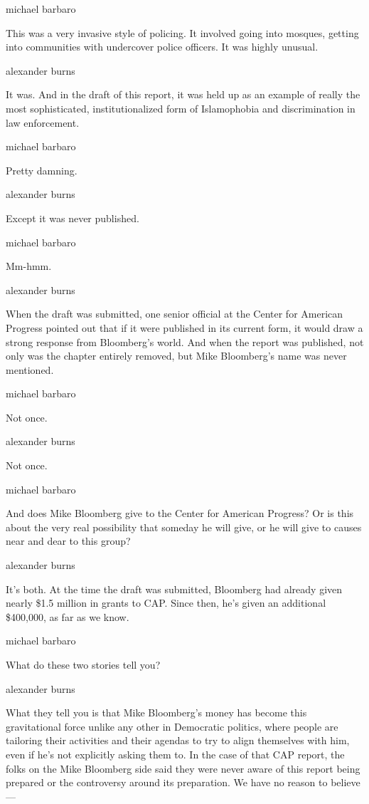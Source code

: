 michael barbaro

This was a very invasive style of policing. It involved going into
mosques, getting into communities with undercover police officers. It
was highly unusual.

alexander burns

It was. And in the draft of this report, it was held up as an example of
really the most sophisticated, institutionalized form of Islamophobia
and discrimination in law enforcement.

michael barbaro

Pretty damning.

alexander burns

Except it was never published.

michael barbaro

Mm-hmm.

alexander burns

When the draft was submitted, one senior official at the Center for
American Progress pointed out that if it were published in its current
form, it would draw a strong response from Bloomberg's world. And when
the report was published, not only was the chapter entirely removed, but
Mike Bloomberg's name was never mentioned.

michael barbaro

Not once.

alexander burns

Not once.

michael barbaro

And does Mike Bloomberg give to the Center for American Progress? Or is
this about the very real possibility that someday he will give, or he
will give to causes near and dear to this group?

alexander burns

It's both. At the time the draft was submitted, Bloomberg had already
given nearly \$1.5 million in grants to CAP. Since then, he's given an
additional \$400,000, as far as we know.

michael barbaro

What do these two stories tell you?

alexander burns

What they tell you is that Mike Bloomberg's money has become this
gravitational force unlike any other in Democratic politics, where
people are tailoring their activities and their agendas to try to align
themselves with him, even if he's not explicitly asking them to. In the
case of that CAP report, the folks on the Mike Bloomberg side said they
were never aware of this report being prepared or the controversy around
its preparation. We have no reason to believe ---

